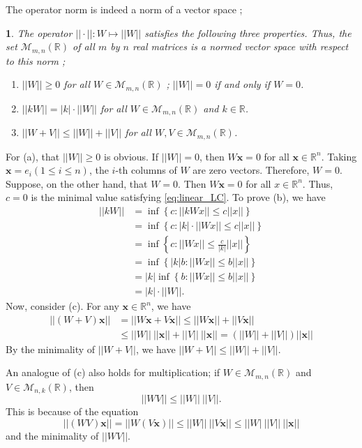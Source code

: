 \documentclass[12pt]{report}
\numberwithin{figure}{chapter}
\theoremstyle{plain}
\theoremstyle{definition}
\theoremstyle{corollary}
\theoremstyle{definition}
\theoremstyle{plain}
\newtheorem{proposition}[theorem]{\protect\propositionname}
\theoremstyle{definition}
\theoremstyle{plain}
\providecommand{\propositionname}{Proposition}
\newcommand\bx{\ensuremath{\boldsymbol x}}
\begin{document}
The operator norm is indeed a norm of a vector space ;
\begin{proposition}\label{prop:operator_norm_1}
The operator \(||\cdot||:W\mapsto||W||\) satisfies the following three properties.
Thus, the set \(\mathcal M_{m,n}(\mathbb R)\) of all \(m\) by \(n\) real matrices is a normed vector space with respect to this norm ;
\begin{enumerate}[label=(\alph*)]
\item
\(||W||\ge0\) for all \(W\in\mathcal M_{m,n}(\mathbb R)\) ; \(||W||=0\) if and only if \(W=0\).
\item
\(||kW||=|k|\cdot||W||\) for all \(W\in\mathcal M_{m,n}(\mathbb R)\) and \(k\in\mathbb R\).
\item
\(||W+V||\le||W||+||V||\) for all \(W,V\in\mathcal M_{m,n}(\mathbb R)\).
\end{enumerate}
\end{proposition}
For (a), that \(||W||\ge0\) is obvious.
If \(||W||=0\), then \(W\bx=0\) for all \(\bx\in\mathbb R^n\).
Taking \(\bx=e_i(1\le i\le n)\), the \(i\)-th columns of \(W\) are zero vectors.
Therefore, \(W=0\).
Suppose, on the other hand, that \(W=0\). Then \(W\bx=0\) for all \(x\in\mathbb R^n\).
Thus, \(c=0\) is the minimal value satisfying \eqref{eq:linear_LC}.
To prove (b), we have
\begin{align*}
||kW||
&=\inf\left\{c:||kWx||\le c||x||\right\}\\
&=\inf\left\{c:|k|\cdot||Wx||\le c||x||\right\}\\
&=\inf\left\{c:||Wx||\le\frac{c}{|k|}||x||\right\}\\
&=\inf\left\{|k|b:||Wx||\le b||x||\right\}\\
&=|k|\inf\left\{b:||Wx||\le b||x||\right\}\\
&=|k|\cdot||W||.
\end{align*}
Now, consider (c).
For any \(\bx\in\mathbb R^n\), we have
\begin{align*}
||(W+V)\bx||
&=||W\bx+V\bx||\le||W\bx||+||V\bx||\\
&\le||W||\:||\bx||+||V||\:||\bx||=(||W||+||V||)||\bx||
\end{align*}
By the minimality of \(||W+V||\), we have \(||W+V||\le||W||+||V||\).

An analogue of (c) also holds for multiplication;
if \(W\in\mathcal M_{m,n}(\mathbb R)\) and \(V\in\mathcal M_{n,k}(\mathbb R)\), then
\begin{equation}\label{eq:multiplicative_inequality}
||WV||\le||W||\:||V||.
\end{equation}
This is because of the equation
\[||(WV)\bx||=||W(V\bx)||\le||W||\:||V\bx||\le||W|\:||V||\:||\bx||\]
and the minimality of \(||WV||\).
\end{document}
